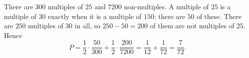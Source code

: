 There are $300$ multiples of $25$ and $7200$ non-multiples. A multiple of $25$ is a multiple of $30$ exactly when it is a multiple of $150$: there are $50$ of these. There are $250$ multiples of $30$ in all, so $250-50=200$ of them are not multiples of $25$. Hence
\[P=\dfrac12\cdot\dfrac{50}{300}+\dfrac12\cdot\dfrac{200}{7200}=\dfrac1{12}+\dfrac1{72}=\boxed{\dfrac7{72}}.\]
